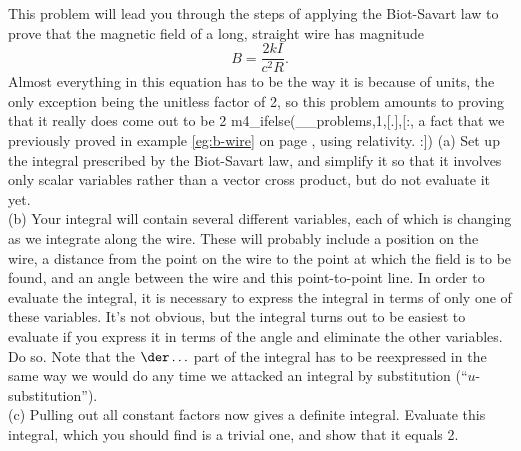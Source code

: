 This problem will lead you through the steps of applying the Biot-Savart law to prove that the
magnetic field of a long, straight wire has magnitude
\begin{equation*}
  B = \frac{2 kI}{ c^2 R}.
\end{equation*}
Almost everything in this equation has to be the way it is because of units, the only
exception being the unitless factor of 2, so this problem amounts to proving that it
really does come out to be 2%
m4_ifelse(__problems,1,[.],[:,
  a fact that we previously proved in example \ref{eg:b-wire} on page
  \pageref{eg:b-wire}, using relativity.
:])
(a) Set up the integral prescribed by the Biot-Savart law, and simplify it so that it involves
only scalar variables rather than a vector cross product, but do not evaluate it yet.\\
(b) Your integral will contain several different variables, each of which is changing as
we integrate along the wire. These will probably include a position on the wire,
a distance from the point on the wire to the point at which the field is to be found,
and an angle between the wire and this point-to-point line. In order to evaluate the integral,
it is necessary to express the integral in terms of only one of these variables. It's not obvious,
but the integral turns out to be easiest to evaluate if you express it in terms of the angle
and eliminate the other variables. Do so. Note that the $\der\ldots$ part of the integral has
to be reexpressed in the same way we would do any time we attacked an integral by substitution
(``$u$-substitution'').\\
(c) Pulling out all constant factors now gives a definite integral. Evaluate this integral,
which you should find is a trivial one, and show that it equals 2.


